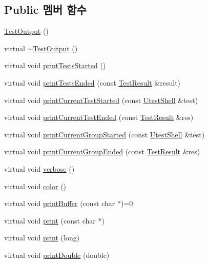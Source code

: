 \subsection*{Public 멤버 함수}
\begin{DoxyCompactItemize}
\item 
\hyperlink{class_test_output_abfe96e2e1d5b5e06645b78c062ea7912}{Test\+Output} ()
\item 
virtual \hyperlink{class_test_output_a995a5a5aad6f5744da19a49e1285e8d0}{$\sim$\+Test\+Output} ()
\item 
virtual void \hyperlink{class_test_output_a1c2b129bfdc2b392ffa618864707dd89}{print\+Tests\+Started} ()
\item 
virtual void \hyperlink{class_test_output_acc5ba82a215510b66f5f294258686dd4}{print\+Tests\+Ended} (const \hyperlink{class_test_result}{Test\+Result} \&result)
\item 
virtual void \hyperlink{class_test_output_aa3e637e450766d2d1a6090f2bab8bf08}{print\+Current\+Test\+Started} (const \hyperlink{class_utest_shell}{Utest\+Shell} \&test)
\item 
virtual void \hyperlink{class_test_output_a67acd3c53695126b4728c7da0d2b0b51}{print\+Current\+Test\+Ended} (const \hyperlink{class_test_result}{Test\+Result} \&res)
\item 
virtual void \hyperlink{class_test_output_afe801c9e014df78dd6cd5e199ba8c6e0}{print\+Current\+Group\+Started} (const \hyperlink{class_utest_shell}{Utest\+Shell} \&test)
\item 
virtual void \hyperlink{class_test_output_a037b2a87826c7f59e7353cb137deacae}{print\+Current\+Group\+Ended} (const \hyperlink{class_test_result}{Test\+Result} \&res)
\item 
virtual void \hyperlink{class_test_output_a2ae0a8d48809abb33b5ba47c56fdc3ad}{verbose} ()
\item 
virtual void \hyperlink{class_test_output_ae8d23f2d3de1d9d47d8139d54fb89640}{color} ()
\item 
virtual void \hyperlink{class_test_output_a83ee46e0da3bb079280fc397b48026d8}{print\+Buffer} (const char $\ast$)=0
\item 
virtual void \hyperlink{class_test_output_a321b5c489a90374cb61c34fe5d2253ef}{print} (const char $\ast$)
\item 
virtual void \hyperlink{class_test_output_afdf7e5004a8aead20ea3b1ddec76fa73}{print} (long)
\item 
virtual void \hyperlink{class_test_output_a0ed13c187762336a2bf0fd89687b014a}{print\+Double} (double)

\end{DoxyCompactItemize}
